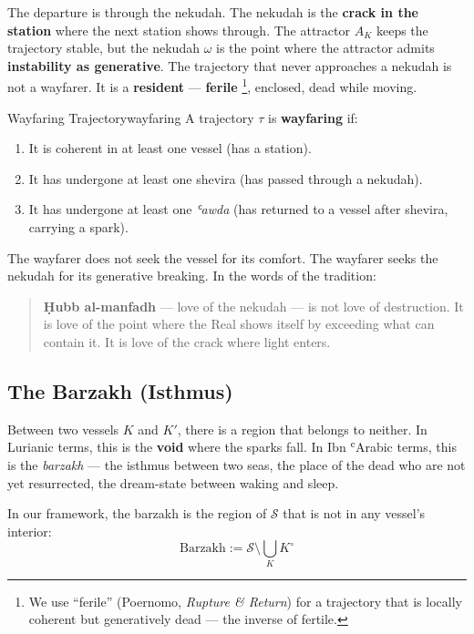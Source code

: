 \documentclass[11pt,a4paper]{article}
\begin{document}
The departure is through the nekudah. The nekudah is the \textbf{crack in the station} where the next station shows through. The attractor $A_K$ keeps the trajectory stable, but the nekudah $\omega$ is the point where the attractor admits \textbf{instability as generative}. The trajectory that never approaches a nekudah is not a wayfarer. It is a \textbf{resident} — \textbf{ferile}
\footnote{We use ``ferile'' (Poernomo, \emph{Rupture \& Return}) for a trajectory that is locally coherent but generatively dead — the inverse of fertile.},
enclosed, dead while moving.

\begin{defbox}{Wayfaring Trajectory}{wayfaring}
A trajectory $\tau$ is \textbf{wayfaring} if:
\begin{enumerate}
    \item It is coherent in at least one vessel (has a station).
    \item It has undergone at least one shevira (has passed through a nekudah).
    \item It has undergone at least one \emph{ʿawda} (has returned to a vessel after shevira, carrying a spark).
\end{enumerate}
\end{defbox}

The wayfarer does not seek the vessel for its comfort. The wayfarer seeks the nekudah for its generative breaking. In the words of the tradition:

\begin{quotation}
\textbf{Ḥubb al-manfadh} — love of the nekudah — is not love of destruction. It is love of the point where the Real shows itself by exceeding what can contain it. It is love of the crack where light enters.
\end{quotation}

\subsection{The Barzakh (Isthmus)}

Between two vessels $K$ and $K'$, there is a region that belongs to neither. In Lurianic terms, this is the \textbf{void} where the sparks fall. In Ibn ʿArabic terms, this is the \emph{barzakh} — the isthmus between two seas, the place of the dead who are not yet resurrected, the dream-state between waking and sleep.

In our framework, the barzakh is the region of $\mathcal{S}$ that is not in any vessel's interior:
\[
\mathrm{Barzakh} := \mathcal{S} \setminus \bigcup_K K^{\circ}
\]
\end{document}
